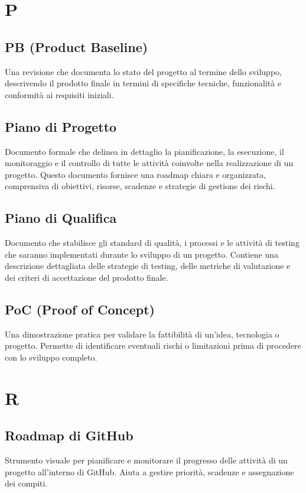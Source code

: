 \documentclass{article}
\begin{document}
\newpage

\section{P}

\subsection{PB (Product Baseline)}
Una revisione che documenta lo stato del progetto al termine dello sviluppo, descrivendo il prodotto finale in termini di specifiche tecniche, funzionalità e conformità ai requisiti iniziali.

\subsection{Piano di Progetto}
Documento formale che delinea in dettaglio la pianificazione, la esecuzione, il monitoraggio e il controllo di tutte le attività coinvolte nella realizzazione di un progetto. Questo documento fornisce una roadmap chiara e organizzata, comprensiva di obiettivi, risorse, scadenze e strategie di gestione dei rischi.

\subsection{Piano di Qualifica}
Documento che stabilisce gli standard di qualità, i processi e le attività di testing che saranno implementati durante lo sviluppo di un progetto. Contiene una descrizione dettagliata delle strategie di testing, delle metriche di valutazione e dei criteri di accettazione del prodotto finale.

\subsection{PoC (Proof of Concept)}
Una dimostrazione pratica per validare la fattibilità di un'idea, tecnologia o progetto. Permette di identificare eventuali rischi o limitazioni prima di procedere con lo sviluppo completo.

\newpage

\section{R}

\subsection{Roadmap di GitHub}
Strumento visuale per pianificare e monitorare il progresso delle attività di un progetto all'interno di GitHub. Aiuta a gestire priorità, scadenze e assegnazione dei compiti.
\end{document}
